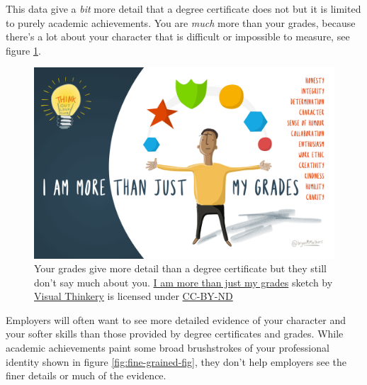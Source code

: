 \documentclass[
]{book}
\begin{document}
This data give a \emph{bit} more detail that a degree certificate does not but it is limited to purely academic achievements. You are \emph{much} more than your grades, because there's a lot about your character that is difficult or impossible to measure, see figure \ref{fig:more-than-grades-fig}.

\begin{figure}

{\centering \includegraphics[width=1\linewidth]{images/i-am-more-than-just-my-grades} 

}

\caption{Your grades give more detail than a degree certificate but they still don't say much about you. \href{https://bryanmmathers.com/i-am-more-than-just-my-grades/}{I am more than just my grades} sketch by \href{https://visualthinkery.com/}{Visual Thinkery} is licensed under \href{https://creativecommons.org/licenses/by-nd/4.0/}{CC-BY-ND}}\label{fig:more-than-grades-fig}
\end{figure}



Employers will often want to see more detailed evidence of your character and your softer skills than those provided by degree certificates and grades. While academic achievements paint some broad brushstrokes of your professional identity shown in figure \ref{fig:fine-grained-fig}, they don't help employers see the finer details or much of the evidence.
\end{document}
